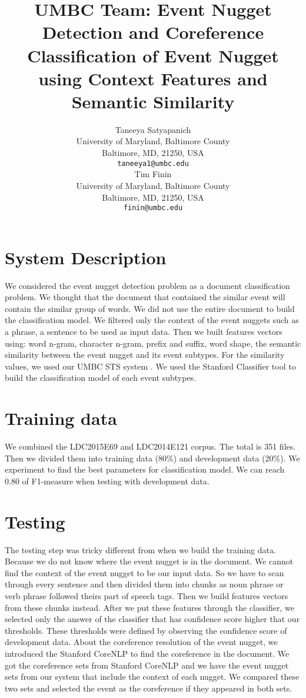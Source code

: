 \documentclass[11pt]{article}
\title{UMBC Team: Event Nugget Detection and Coreference
Classification of Event Nugget using Context Features and Semantic Similarity
}
\author{Taneeya Satyapanich  \\
  University of Maryland, Baltimore County \\
  Baltimore, MD, 21250, USA \\
  {\tt taneeya1@umbc.edu} \\\And
  Tim Finin \\
  University of Maryland, Baltimore County \\
  Baltimore, MD, 21250, USA \\
  {\tt finin@umbc.edu} \\}
\date{}
\begin{document}
\maketitle


\section{System Description}

We considered the event nugget detection problem as a document classification problem. We thought that the document that contained the similar event will contain the similar group of words. We did not use the entire document to build the classification model. We filtered only the context of the event nuggets such as a phrase, a sentence to be used as input data. Then we built features vectors using: word n-gram, character n-gram, prefix and suffix, word shape, the semantic similarity between the event nugget and its event subtypes. For the similarity values, we used our UMBC STS system \cite{Han:13}. We used the Stanford Classifier tool \cite{Man:03} to build the classification model of each event subtypes. 

\section{Training data}

We combined the LDC2015E69 and LDC2014E121 corpus. The total is 351 files. Then we divided them into training data (80\%) and development data (20\%). We experiment to find the best parameters for classification model. We can reach 0.80 of F1-measure when testing with development data.


\section{Testing}

The testing step was tricky different from when we build the training data. Because we do not know where the event nugget is in the document. We cannot find the context of the event nugget to be our input data. So we have to scan through every sentence and then divided them into chunks as noun phrase or verb phrase followed theirs part of speech tags. Then we build features vectors from these chunks instead. After we put these features through the classifier, we selected only the answer of the classifier that has confidence score higher that our thresholds. These thresholds were defined by observing the confidence score of development data. About the coreference resolution of the event nugget, we introduced the Stanford CoreNLP \cite{Man:14} to find the coreference in the document. We got the coreference sets from Stanford CoreNLP and we have the event nugget sets from our system that include the context of each nugget. We compared these two sets and selected the event as the coreference if they appeared in both sets.
\end{document}

